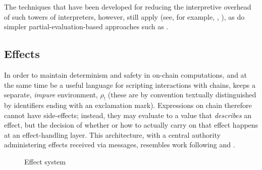 The techniques that have been developed for reducing the interpretive overhead
of such towers of interpreters, however, still
apply (see, for example, \cite{Amin2017}, \cite{Asai2014}), as do simpler
partial-evaluation-based approaches such as \cite{Brown2017}.



\subsection{Effects} In order to maintain determinism and safety in on-chain
computations, and at the same time be a useful language for scripting
interactions with chains, \rad keeps a separate, \emph{impure} environment,
$\rho_{!}$ (these are by convention textually distinguished by identifiers
ending with an exclamation mark). Expressions on chain therefore cannot have
side-effects; instead, they may evaluate to a value that \emph{describes} an effect,
but the decision of whether or how to actually carry on that effect happens at an
effect-handling layer. This architecture, with a central authority
administering effects received via messages, resembles work following
\cite{Cartwright1994} and \cite{Bauer2003}.


\begin{figure}[H]
\caption{Effect system}
\label{f:effects}
\end{figure}

